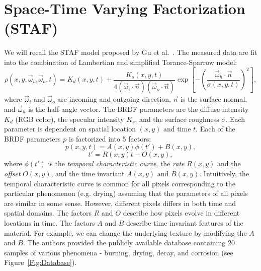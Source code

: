 \documentclass[11pt]{article}
\begin{document}
\section{Space-Time Varying Factorization (STAF)}
We will recall the STAF model proposed by Gu et al.~\cite{Gu2006}. The measured data are fit into the combination of Lambertian and simplified Torance-Sparrow model:
\begin{equation}
\rho(x,y,\vec{\omega}_i, \vec{\omega}_o, t) = K_d(x,y,t) + \frac{K_s(x,y,t)}{4(\vec{\omega}_i \cdot \vec{n})(\vec{\omega}_o \cdot \vec{n})}\exp\left[-\left(\frac{\vec{\omega}_h \cdot \vec{n}}{\sigma(x,y,t)}\right)^2\right],
\end{equation}
where $\vec{\omega}_i$ and $\vec{\omega}_o$ are incoming and outgoing direction, $\vec{n}$ is the surface normal, and $\vec{\omega}_h$ is the half-angle vector. The BRDF parameters are the diffuse intensity $K_d$ (RGB color), the specular intensity $K_s$, and the surface roughness $\sigma$. Each parameter is dependent on spatial location $(x,y)$ and time $t$. Each of the BRDF parameters $p$ is factorized into 5 factors:
\begin{equation}
p(x,y,t) = A(x,y)\phi(t')+B(x,y),
\end{equation}
\begin{equation}
t'=R(x,y)t-O(x,y),
\end{equation}
where $\phi(t')$ is the \emph{temporal characteristic curve}, the \emph{rate} $R(x,y)$ and the \emph{offset} $O(x,y)$, and the time invariant $A(x,y)$ and $B(x,y)$. Intuitively, the temporal characteristic curve is common for all pixels corresponding to the particular  phenomenon (e.g. drying) assuming that the parameters of all pixels are similar in some sense. However, different pixels differs in both time and spatial domains. The factors $R$ and $O$ describe how pixels evolve in different locations in time. The factors $A$ and $B$ describe time invariant features of the material. For example, we can change the underlying texture by modifying the $A$ and $B$. The authors provided the publicly available database containing 20 samples of various phenomena - burning, drying, decay, and corrosion (see Figure~\ref{Fig:Database}). 
\end{document}
